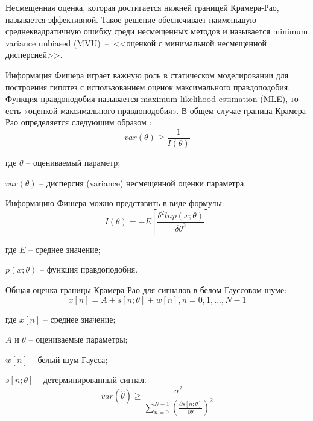 

Несмещенная оценка, которая достигается нижней границей Крамера-Рао, называется эффективной. Такое решение обеспечивает наименьшую среднеквадратичную ошибку среди несмещенных методов и называется minimum variance unbiased (MVU)~--~<<оценкой с минимальной несмещенной дисперсией>>.

Информация Фишера играет важную роль в статическом моделировании для построения гипотез с использованием оценок максимального правдоподобия. Функция правдоподобия называется maximum likelihood estimation (MLE), то есть «оценкой максимального правдоподобия». В общем случае граница Крамера-Рао определяется следующим образом \cite{kay1993fundamentals}:
\begin{equation}
	\label{eq:equation13}
	var(\theta)\geq \frac{1}{I(\theta)}
\end{equation}

где $\theta$ – оцениваемый параметр;

$var(\theta)$ – дисперсия (variance) несмещенной оценки параметра.

Информацию Фишера можно представить в виде формулы:
\begin{equation}
	\label{eq:equation14}
	I(\theta) = -E \left[\frac{\delta^2 ln p(x;\theta)}{\delta\theta^2}\right]
\end{equation}

где $E$ – среднее значение;

$p(x;\theta)$ – функция правдоподобия.

Общая оценка границы Крамера-Рао для сигналов в белом Гауссовом шуме:
\begin{equation}
	\label{eq:equation14}
	x[n] = A + s[n;\theta] + w[n], n=0,1,...,N-1	
\end{equation}

где $x[n]$ -- среднее значение;

$A$ и $\theta$  -- оцениваемые параметры;

$w[n]$ -- белый шум Гаусса;

$s[n;\theta]$ -- детерминированный сигнал.
\begin{equation}
	\label{eq:equation14}
	var(\hat{\theta}) \geq \frac{\sigma^2}{\displaystyle\sum_{n=0}^{N-1} \left(\frac{\partial s [n; \theta]}{\partial\theta}\right)^2} 
\end{equation}

